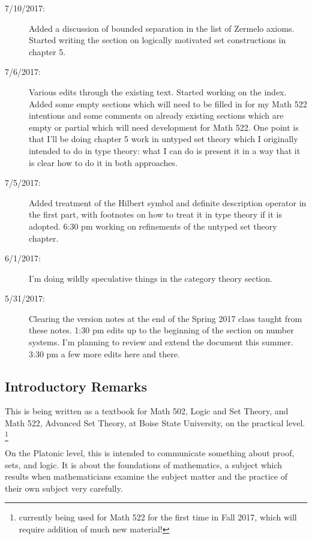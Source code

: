 \documentclass[12pt]{book}
\begin{document}
{\begin{description}
\item[7/10/2017:]  Added a discussion of bounded separation in the list of Zermelo axioms.  Started writing the section on logically motivated set constructions in chapter 5.

\item[7/6/2017:]  Various edits through the existing text.  Started working on the index.  Added some empty sections which will need to be filled in for my Math 522 intentions and some comments on already existing sections which are empty or partial which will need development for Math 522.  One point is that I'll be doing chapter 5 work in untyped set theory which I originally intended to do in type theory:  what I can do is present it in a way that it is clear how to do it in both approaches.

\item[7/5/2017:]  Added treatment of the Hilbert symbol and definite description operator in the first part, with footnotes on how to treat it in type theory if it is adopted.  6:30 pm working on refinements of the untyped set theory chapter.

\item[6/1/2017:]  I'm doing wildly speculative things in the category theory section.

\item[5/31/2017:]  Clearing the version notes at the end of the Spring 2017 class taught from these notes.  1:30 pm edits up to the beginning of the section on number systems.  I'm planning to review and extend the document this summer.  3:30 pm a few more edits here and there.

\end{description}}

\newpage

\subsection{Introductory Remarks}

This is being written as a textbook for Math 502, Logic and Set Theory, and Math 522, Advanced Set Theory,
at Boise State University, on the practical level.  \footnote{currently being used for Math 522 for the first time in Fall 2017, which will require addition of much new material!}

On the Platonic level, this is intended to communicate something about
proof, sets, and logic.  It is about the foundations of mathematics, a
subject which results when mathematicians examine the subject matter
and the practice of their own subject very carefully.
\end{document}
